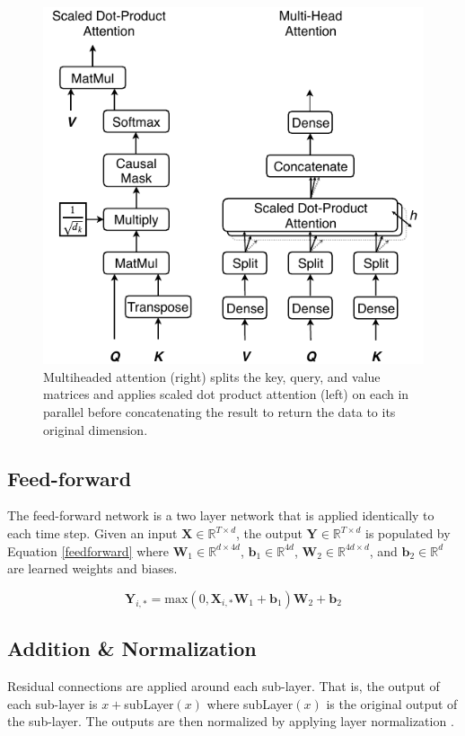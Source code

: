 \documentclass[conference]{IEEEtran}
\begin{document}
\begin{figure}[htbp]
	\centerline{\includegraphics[width=.35\textwidth]{images/multihead_attn.pdf}}
	\caption{Multiheaded attention (right) splits the key, query, and value matrices and applies scaled dot product attention (left) on each in parallel before concatenating the result to return the data to its original dimension.}
	\label{fig:multihead}
\end{figure}

\subsection{Feed-forward}
The feed-forward network is a two layer network that is applied identically to each time step.
Given an input $\boldsymbol{X} \in \mathbb{R}^{T \times d}$, the output $\boldsymbol{Y} \in \mathbb{R}^{T \times d}$ is populated by Equation \ref{feedforward} where $\boldsymbol{W}_1 \in \mathbb{R}^{d \times 4d}$, $\boldsymbol{b}_1 \in \mathbb{R}^{4d}$, $\boldsymbol{W}_2 \in \mathbb{R}^{4d \times d}$, and $\boldsymbol{b}_2 \in \mathbb{R}^{d}$ are learned weights and biases.

\begin{equation} \label{feedforward}
\boldsymbol{Y}_{i,*} = \text{max}(0, \boldsymbol{X}_{i,*}  \boldsymbol{W}_1 + \boldsymbol{b}_1)  \boldsymbol{W}_2 + \boldsymbol{b}_2
\end{equation}

\subsection{Addition \& Normalization}
Residual connections \cite{He2015} are applied around each sub-layer.
That is, the output of each sub-layer is $x + $subLayer$(x)$ where subLayer$(x)$ is the original output of the sub-layer.
The outputs are then normalized by applying layer normalization \cite{Ba2016}.
\end{document}
